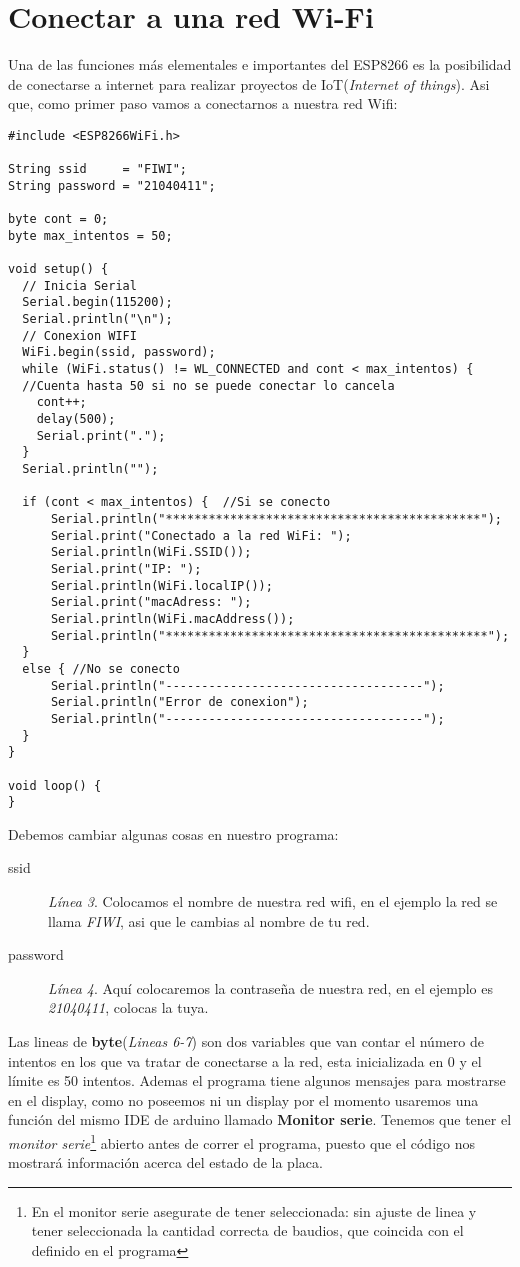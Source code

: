 \documentclass[
	12pt, %
	fleqn, %
	a4paper, %
	oneside, %
]{LegrandOrangeBook}
\begin{document}
\section{Conectar a una red Wi-Fi}
Una de las funciones más elementales e importantes del ESP8266 es la posibilidad de conectarse a internet para realizar proyectos de IoT(\textit{Internet of things}). Asi que, como primer paso vamos a conectarnos a nuestra red Wifi:
\begin{lstlisting}[language=Arduino,caption={Conectarse a una red WiFi}]
#include <ESP8266WiFi.h>

String ssid     = "FIWI";
String password = "21040411";

byte cont = 0;
byte max_intentos = 50;

void setup() {
  // Inicia Serial
  Serial.begin(115200);
  Serial.println("\n");
  // Conexion WIFI
  WiFi.begin(ssid, password);
  while (WiFi.status() != WL_CONNECTED and cont < max_intentos) { 
  //Cuenta hasta 50 si no se puede conectar lo cancela
    cont++;
    delay(500);
    Serial.print(".");
  }
  Serial.println("");

  if (cont < max_intentos) {  //Si se conecto      
      Serial.println("********************************************");
      Serial.print("Conectado a la red WiFi: ");
      Serial.println(WiFi.SSID());
      Serial.print("IP: ");
      Serial.println(WiFi.localIP());
      Serial.print("macAdress: ");
      Serial.println(WiFi.macAddress());
      Serial.println("*********************************************");
  }
  else { //No se conecto
      Serial.println("------------------------------------");
      Serial.println("Error de conexion");
      Serial.println("------------------------------------");
  }
}

void loop() {
}
\end{lstlisting}
Debemos cambiar algunas cosas en nuestro programa:
\begin{description}
\item[ssid] \textit{Línea 3}. Colocamos el nombre de nuestra red wifi, en el ejemplo la red se llama \textit{FIWI}, asi que le cambias al nombre de tu red.
\item[password] \textit{Línea 4}. Aquí colocaremos la contraseña de nuestra red, en el ejemplo es \textit{21040411}, colocas la tuya.
\end{description}
Las lineas de \textbf{byte}(\textit{Lineas 6-7}) son dos variables que van contar el número de intentos en los que va tratar de conectarse a la red, esta inicializada en 0 y el límite es 50 intentos. Ademas el programa tiene algunos mensajes para mostrarse en el display, como no poseemos ni un display por el momento usaremos una función del mismo IDE de arduino llamado \textbf{Monitor serie}. Tenemos que tener el \textit{monitor serie}\footnote{En el monitor serie asegurate de tener seleccionada: sin ajuste de linea y tener seleccionada la cantidad correcta de baudios, que coincida con el definido en el programa} abierto antes de correr el programa, puesto que el código nos mostrará información acerca del estado de la placa.
\end{document}
